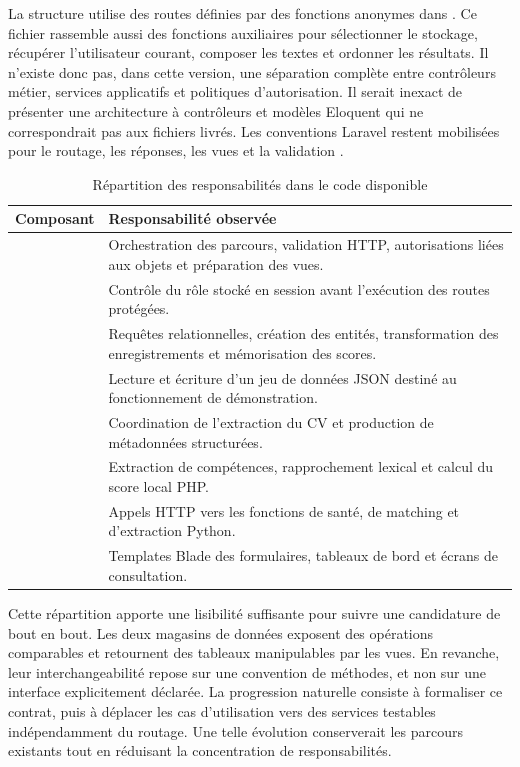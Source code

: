 La structure utilise des routes définies par des fonctions anonymes dans . Ce fichier rassemble aussi des fonctions auxiliaires pour sélectionner le stockage, récupérer l'utilisateur courant, composer les textes et ordonner les résultats. Il n'existe donc pas, dans cette version, une séparation complète entre contrôleurs métier, services applicatifs et politiques d'autorisation. Il serait inexact de présenter une architecture à contrôleurs et modèles Eloquent qui ne correspondrait pas aux fichiers livrés. Les conventions Laravel restent mobilisées pour le routage, les réponses, les vues et la validation \cite{laravel-routing,laravel-validation}.

\begin{table}[htbp]
\centering
\small
\caption{Répartition des responsabilités dans le code disponible}
\label{tab:realisation-responsabilites}
\begin{tabularx}{\textwidth}{@{}P{0.29\textwidth}X@{}}
\toprule
Composant & Responsabilité observée \\
\midrule
{} & Orchestration des parcours, validation HTTP, autorisations liées aux objets et préparation des vues. \\
 & Contrôle du rôle stocké en session avant l'exécution des routes protégées. \\
 & Requêtes relationnelles, création des entités, transformation des enregistrements et mémorisation des scores. \\
 & Lecture et écriture d'un jeu de données JSON destiné au fonctionnement de démonstration. \\
 & Coordination de l'extraction du CV et production de métadonnées structurées. \\
 & Extraction de compétences, rapprochement lexical et calcul du score local PHP. \\
 & Appels HTTP vers les fonctions de santé, de matching et d'extraction Python. \\
 & Templates Blade des formulaires, tableaux de bord et écrans de consultation. \\
\bottomrule
\end{tabularx}
\end{table}

Cette répartition apporte une lisibilité suffisante pour suivre une candidature de bout en bout. Les deux magasins de données exposent des opérations comparables et retournent des tableaux manipulables par les vues. En revanche, leur interchangeabilité repose sur une convention de méthodes, et non sur une interface explicitement déclarée. La progression naturelle consiste à formaliser ce contrat, puis à déplacer les cas d'utilisation vers des services testables indépendamment du routage. Une telle évolution conserverait les parcours existants tout en réduisant la concentration de responsabilités.

